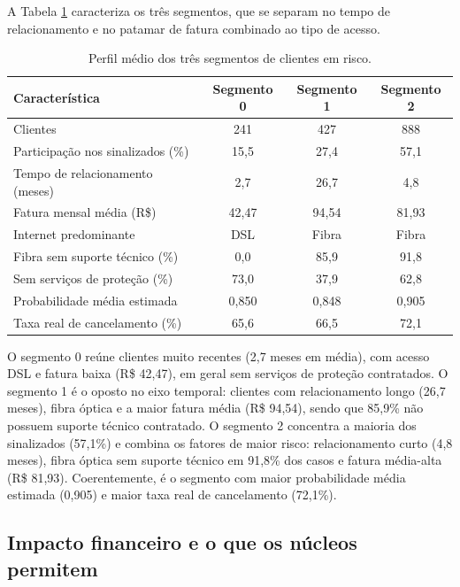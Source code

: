 \documentclass[12pt]{article}
\begin{document}
A Tabela \ref{tab:perfis} caracteriza os três segmentos, que se separam no
tempo de relacionamento e no patamar de fatura combinado ao tipo de acesso.

\begin{table}[ht]
\centering
\caption{Perfil médio dos três segmentos de clientes em risco.}
\label{tab:perfis}
\small
\begin{tabular}{|l|c|c|c|}
\hline
\textbf{Característica} & \textbf{Segmento 0} & \textbf{Segmento 1} & \textbf{Segmento 2} \\
\hline
Clientes                        & 241 & 427 & 888 \\ \hline
Participação nos sinalizados (\%) & 15,5 & 27,4 & 57,1 \\ \hline
Tempo de relacionamento (meses) & 2,7 & 26,7 & 4,8 \\ \hline
Fatura mensal média (R\$)       & 42,47 & 94,54 & 81,93 \\ \hline
Internet predominante           & DSL & Fibra & Fibra \\ \hline
Fibra sem suporte técnico (\%)  & 0,0 & 85,9 & 91,8 \\ \hline
Sem serviços de proteção (\%)   & 73,0 & 37,9 & 62,8 \\ \hline
Probabilidade média estimada    & 0,850 & 0,848 & 0,905 \\ \hline
Taxa real de cancelamento (\%)  & 65,6 & 66,5 & 72,1 \\
\hline
\end{tabular}
\end{table}

O segmento 0 reúne clientes muito recentes (2,7 meses em média), com acesso DSL
e fatura baixa (R\$ 42,47), em geral sem serviços de proteção contratados. O
segmento 1 é o oposto no eixo temporal: clientes com relacionamento longo (26,7
meses), fibra óptica e a maior fatura média (R\$ 94,54), sendo que 85,9\% não
possuem suporte técnico contratado. O segmento 2 concentra a maioria dos
sinalizados (57,1\%) e combina os fatores de maior risco: relacionamento curto
(4,8 meses), fibra óptica sem suporte técnico em 91,8\% dos casos e fatura
média-alta (R\$ 81,93). Coerentemente, é o segmento com maior probabilidade
média estimada (0,905) e maior taxa real de cancelamento (72,1\%).

\subsection{Impacto financeiro e o que os núcleos permitem}
\end{document}
